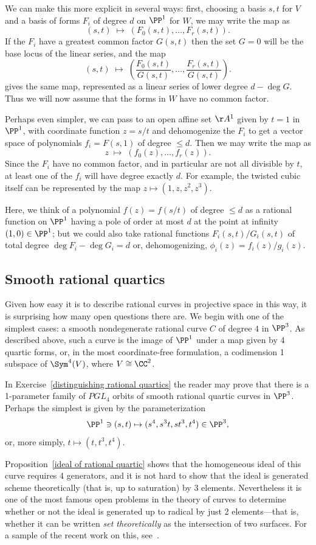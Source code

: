 We can make this more explicit in several ways: first, choosing a basis $s,t$ for $V$ and a basis of forms $F_i$ of degree $d$ on $\PP^1$ for $W$, we may write the map as
$$
(s,t) \; \mapsto \; (F_0(s,t), \dots, F_r(s,t)).
$$
If the $F_i$ have a greatest common factor $G(s,t)$ then the set $G=0$ will be the base locus
of the linear series, and the map
$$
(s,t) \; \mapsto \; ( \frac{F_0(s,t)}{G(s,t)}, \dots, \frac{F_r(s,t)}{G(s,t)}).
$$
gives the same map, represented as a linear series of lower degree $d-\deg G$. Thus we
will now assume that the forms in $W$ have no common factor.

Perhaps even simpler, we can pass to an open affine set $\AA^1$ given by $t=1$ in $\PP^1$, with coordinate function $z = s/t$ and
dehomogenize the $F_i$ to get a vector space of polynomials $f_i = F(s,1)$ of degree $\leq d$. Then we may write the
map as
$$
z \; \mapsto \; (f_0(z), \dots, f_r(z)).
$$
Since the $F_i$ have no common factor, and in particular are not all divisible by $t$, at least one of the
$f_i$ will have degree exactly $d$.
For example, the twisted cubic itself can be represented by the map
$z \mapsto (1, z,z^2,z^3)$.

Here, we think of a polynomial $f(z) = f(s/t)$ of degree $\leq d$ as a rational function on $\PP^1$ having
a pole of order at most $d$ at the point at infinity $(1,0)\in \PP^1$; but we could also take rational
functions $F_i(s,t)/G_i(s,t)$ of total degree $\deg F_i-\deg G_i = d$ or, dehomogenizing, $\phi_i(z) = f_i(z)/g_i(z)$.

\subsection *{Smooth rational quartics}
Given how easy it is to describe rational curves in projective space in this way, it is surprising how many open questions there are. We begin with
one of the simplest cases: a smooth nondegenerate rational curve $C$ of degree $4$ in $\PP^3$.
As described above, such a curve is the image of $\PP^1$ under a map given by 4 quartic forms,
or, in the most coordinate-free formulation, a codimension 1 subspace of $\Sym^4(V)$, where
$V\cong \CC^2$. 

\begin{example}
In Exercise~\ref{distinguishing rational quartics} the reader may prove that there is a 1-parameter family of 
$PGL_4$ orbits of smooth rational quartic curves in $\PP^3$. Perhaps the simplest is given by the parameterization 
$$
\PP^1 \ni (s,t) \mapsto (s^4, s^3t, st^3, t^4)\in \PP^3,
$$
or, more simply, $t\mapsto(t, t^3, t^4)$. 

Proposition~\ref{ideal of rational quartic} shows that the homogeneous ideal of this curve requires 4 generators, and it is not hard to show
that the ideal is generated scheme theoretically (that is, up to saturation) by 3 elements. Nevertheless it is
one of the most famous open problems in the theory of curves to determine whether or not the ideal
is generated up to radical by just 2 elements---that is, whether it
can be written \emph{set theoretically} as the intersection of two surfaces. For a sample of the recent
work on this, see~\cite{MR3356940}. 
\end{example}

